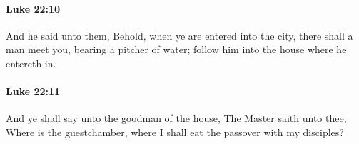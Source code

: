 		\paragraph{Luke 22:10} %
			\label{LUKE-22-10}

			And he said unto them, Behold, when ye are entered into the city, there shall a man meet you, bearing a pitcher of water; follow him into the house where he entereth in.

			\begin{framed}
			\scriptsize
				\begin{compactdesc}
					\item[SBLG] 
				\end{compactdesc}
			\end{framed}

		\paragraph{Luke 22:11} %
			\label{LUKE-22-11}

			And ye shall say unto the goodman of the house, The Master saith unto thee, Where is the guestchamber, where I shall eat the passover with my disciples?

